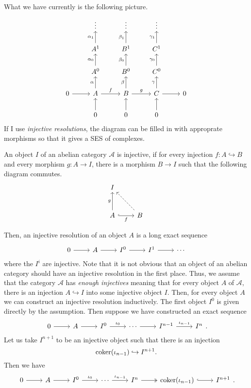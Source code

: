 What we have currently is the following picture.
\[\begin{tikzcd}
    & \vdots & \vdots & \vdots & \\
    & A^{1}\uar{\alpha_{1}} & B^{1}\uar{\beta_{1}} & C^{1}\uar{\gamma_{1}} & \\
    & A^{0}\uar{\alpha_{0}} & B^{0}\uar{\beta_{0}} & C^{0}\uar{\gamma_{0}} & \\
    0\rar& A\rar{f}\uar{\alpha} & B\rar{g}\uar{\beta} & C\rar\uar{\gamma}&0\\
    & 0\uar & 0\uar & 0\uar &
  \end{tikzcd}\]
If I use \emph{injective resolutions}, the diagram can be filled in with
approprate morphisms so that it gives a SES of complexes.
\begin{defin}
  An object $I$ of an abelian category $\mathcal{A}$ is injective,
  if for every injection $f:A\hookrightarrow B$ and every morphism
  $g:A\to I$, there is a morphism $B\to I$ such that the following
  diagram commutes.
  \[\begin{tikzcd}[row sep=large]
      I & \\ A\uar{g}\arrow[r, hook, "f"'] & B\ular[dashed]
    \end{tikzcd}\]
\end{defin}
Then, an injective resolution of an object $A$ is a long exact sequence
\[\begin{tikzcd}
    0\rar & A\rar & I^{0}\rar & I^{1}\rar & \cdots
  \end{tikzcd}\]
where the $I^{i}$ are injective. Note that it is not obvious that an object
of an abelian category should have an injective resolution in the first
place. Thus, we assume that the category $\mathcal{A}$ has
\emph{enough injectives} meaning that for every object $A$ of $\mathcal{A}$,
there is an injection $A\hookrightarrow I$ into some injective object $I$.
Then, for every object $A$ we can construct an injective resolution
inductively. The first object $I^{0}$ is given directly by the assumption.
Then suppose we have constructed an exact sequence
\[\begin{tikzcd}
    0\rar & A\rar & I^{0}\rar{\iota_{0}} & \cdots\rar
    & I^{n-1}\rar{\iota_{n-1}} & I^{n}
  \end{tikzcd}.\]
Let us take $I^{n+1}$ to be an injective object such that there is
an injection
\[\operatorname{coker}(\iota_{n-1})\hookrightarrow I^{n+1}.\]
Then we have
\[\begin{tikzcd}
    0\rar & A\rar & I^{0}\rar{\iota_{0}} & \cdots\rar{\iota_{n-1}}
    & I^{n}\rar[two heads] & \coker(\iota_{n-1})\rar[hook] & I^{n+1}
  \end{tikzcd}.\]

